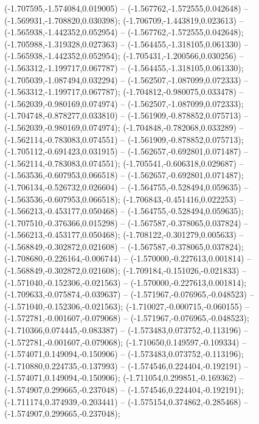  (-1.707595,-1.574084,0.019005) -- (-1.567762,-1.572555,0.042648) -- (-1.569931,-1.708820,0.030398);
 (-1.706709,-1.443819,0.023613) -- (-1.565938,-1.442352,0.052954) -- (-1.567762,-1.572555,0.042648);
 (-1.705988,-1.319328,0.027363) -- (-1.564455,-1.318105,0.061330) -- (-1.565938,-1.442352,0.052954);
 (-1.705431,-1.200566,0.030256) -- (-1.563312,-1.199717,0.067787) -- (-1.564455,-1.318105,0.061330);
 (-1.705039,-1.087494,0.032294) -- (-1.562507,-1.087099,0.072333) -- (-1.563312,-1.199717,0.067787);
 (-1.704812,-0.980075,0.033478) -- (-1.562039,-0.980169,0.074974) -- (-1.562507,-1.087099,0.072333);
 (-1.704748,-0.878277,0.033810) -- (-1.561909,-0.878852,0.075713) -- (-1.562039,-0.980169,0.074974);
 (-1.704848,-0.782068,0.033289) -- (-1.562114,-0.783083,0.074551) -- (-1.561909,-0.878852,0.075713);
 (-1.705112,-0.691423,0.031915) -- (-1.562657,-0.692801,0.071487) -- (-1.562114,-0.783083,0.074551);
 (-1.705541,-0.606318,0.029687) -- (-1.563536,-0.607953,0.066518) -- (-1.562657,-0.692801,0.071487);
 (-1.706134,-0.526732,0.026604) -- (-1.564755,-0.528494,0.059635) -- (-1.563536,-0.607953,0.066518);
 (-1.706843,-0.451416,0.022253) -- (-1.566213,-0.453177,0.050468) -- (-1.564755,-0.528494,0.059635);
 (-1.707510,-0.376366,0.015298) -- (-1.567587,-0.378065,0.037824) -- (-1.566213,-0.453177,0.050468);
 (-1.708122,-0.301279,0.005633) -- (-1.568849,-0.302872,0.021608) -- (-1.567587,-0.378065,0.037824);
 (-1.708680,-0.226164,-0.006744) -- (-1.570000,-0.227613,0.001814) -- (-1.568849,-0.302872,0.021608);
 (-1.709184,-0.151026,-0.021833) -- (-1.571040,-0.152306,-0.021563) -- (-1.570000,-0.227613,0.001814);
 (-1.709633,-0.075874,-0.039637) -- (-1.571967,-0.076965,-0.048523) -- (-1.571040,-0.152306,-0.021563);
 (-1.710027,-0.000715,-0.060155) -- (-1.572781,-0.001607,-0.079068) -- (-1.571967,-0.076965,-0.048523);
 (-1.710366,0.074445,-0.083387) -- (-1.573483,0.073752,-0.113196) -- (-1.572781,-0.001607,-0.079068);
 (-1.710650,0.149597,-0.109334) -- (-1.574071,0.149094,-0.150906) -- (-1.573483,0.073752,-0.113196);
 (-1.710880,0.224735,-0.137993) -- (-1.574546,0.224404,-0.192191) -- (-1.574071,0.149094,-0.150906);
 (-1.711054,0.299851,-0.169362) -- (-1.574907,0.299665,-0.237048) -- (-1.574546,0.224404,-0.192191);
 (-1.711174,0.374939,-0.203441) -- (-1.575154,0.374862,-0.285468) -- (-1.574907,0.299665,-0.237048);

